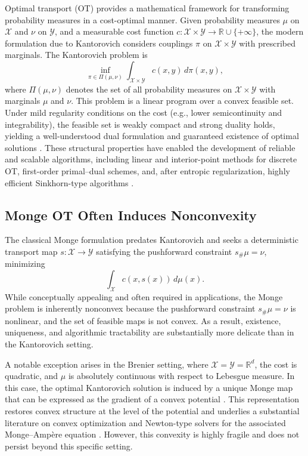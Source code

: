 \documentclass[12pt,leqno]{amsart}
\begin{document}
Optimal transport (OT) provides a mathematical framework for transforming probability measures in a cost-optimal manner. Given probability measures $\mu$ on $\mathcal{X}$ and $\nu$ on $\mathcal{Y}$, and a measurable cost function $c:\mathcal{X}\times\mathcal{Y}\to\mathbb R\cup\{+\infty\}$, the modern formulation due to Kantorovich considers couplings $\pi$ on $\mathcal{X}\times\mathcal{Y}$ with prescribed marginals. The Kantorovich problem is
\begin{equation}
\inf_{\pi\in\Pi(\mu,\nu)} \int_{\mathcal{X}\times\mathcal{Y}} c(x,y)\,d\pi(x,y),
\end{equation}
where $\Pi(\mu,\nu)$ denotes the set of all probability measures on $\mathcal{X}\times\mathcal{Y}$ with marginals $\mu$ and $\nu$. This problem is a linear program over a convex feasible set. Under mild regularity conditions on the cost (e.g., lower semicontinuity and integrability), the feasible set is weakly compact and strong duality holds, yielding a well-understood dual formulation and guaranteed existence of optimal solutions \citep{Villani2003,Villani2009}. These structural properties have enabled the development of reliable and scalable algorithms, including linear and interior-point methods for discrete OT, first-order primal--dual schemes, and, after entropic regularization, highly efficient Sinkhorn-type algorithms \citep{Cuturi2013,PeyreCuturi2019}.

\subsection{Monge OT Often Induces Nonconvexity}
The classical Monge formulation predates Kantorovich and seeks a deterministic transport map $s:\mathcal{X}\to\mathcal{Y}$ satisfying the pushforward constraint $s_\#\mu=\nu$, minimizing
\begin{equation}\label{monge}
\int_{\mathcal{X}} c(x,s(x))\,d\mu(x).
\end{equation}
While conceptually appealing and often required in applications, the Monge problem is inherently nonconvex because the pushforward constraint $s_\#\mu=\nu$ is nonlinear, and the set of feasible maps is not convex. As a result, existence, uniqueness, and algorithmic tractability are substantially more delicate than in the Kantorovich setting.

A notable exception arises in the Brenier setting, where $\mathcal{X}=\mathcal{Y}=\mathbb R^d$, the cost is quadratic, and $\mu$ is absolutely continuous with respect to Lebesgue measure. In this case, the optimal Kantorovich solution is induced by a unique Monge map that can be expressed as the gradient of a convex potential \citep{Brenier1991,McCann1995}. This representation restores convex structure at the level of the potential and underlies a substantial literature on convex optimization and Newton-type solvers for the associated Monge--Amp\`ere equation \citep{FroeseOberman2011,Benamou2014}. However, this convexity is highly fragile and does not persist beyond this specific setting.
\end{document}
